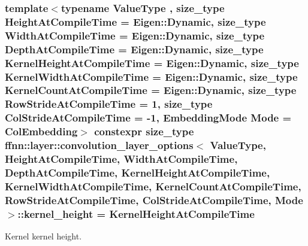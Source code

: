 \hypertarget{structffnn_1_1layer_1_1convolution__layer__options_adfab0e8e8f7e9537dc60a0e56e311161}{
\subsubsection[{kernel\-\_\-height}]{\setlength{\rightskip}{0pt plus 5cm}template$<$typename Value\-Type , size\-\_\-type Height\-At\-Compile\-Time = Eigen\-::\-Dynamic, size\-\_\-type Width\-At\-Compile\-Time = Eigen\-::\-Dynamic, size\-\_\-type Depth\-At\-Compile\-Time = Eigen\-::\-Dynamic, size\-\_\-type Kernel\-Height\-At\-Compile\-Time = Eigen\-::\-Dynamic, size\-\_\-type Kernel\-Width\-At\-Compile\-Time = Eigen\-::\-Dynamic, size\-\_\-type Kernel\-Count\-At\-Compile\-Time = Eigen\-::\-Dynamic, size\-\_\-type Row\-Stride\-At\-Compile\-Time = 1, size\-\_\-type Col\-Stride\-At\-Compile\-Time = -\/1, Embedding\-Mode Mode = Col\-Embedding$>$ constexpr {\bf size\-\_\-type} {\bf ffnn\-::layer\-::convolution\-\_\-layer\-\_\-options}$<$ Value\-Type, Height\-At\-Compile\-Time, Width\-At\-Compile\-Time, Depth\-At\-Compile\-Time, Kernel\-Height\-At\-Compile\-Time, Kernel\-Width\-At\-Compile\-Time, Kernel\-Count\-At\-Compile\-Time, Row\-Stride\-At\-Compile\-Time, Col\-Stride\-At\-Compile\-Time, Mode $>$\-::kernel\-\_\-height = Kernel\-Height\-At\-Compile\-Time\hspace{0.3cm}{\ttfamily [static]}}}\label{structffnn_1_1layer_1_1convolution__layer__options_adfab0e8e8f7e9537dc60a0e56e311161}


Kernel kernel height. 

